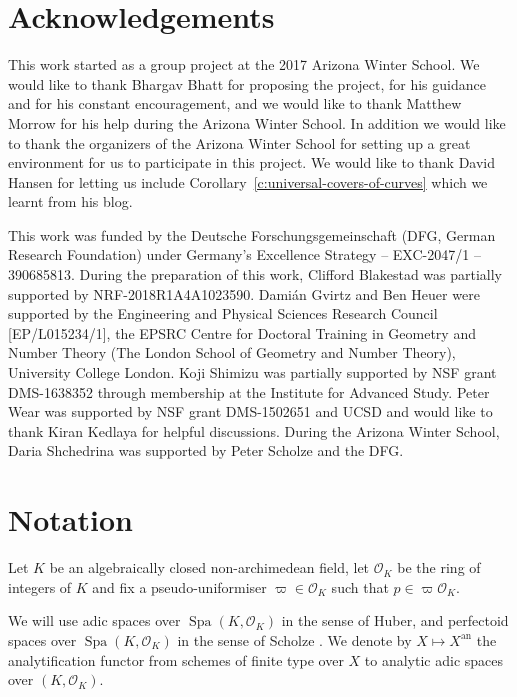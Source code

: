 \documentclass[10pt,oneside]{amsart}
\theoremstyle{definition}
\newcommand{\an}{\mathrm{an}}
\renewcommand{\O}{\mathcal{O}}
\begin{document}
 
 
 \section*{Acknowledgements}
 This work started as a group project at the 2017 Arizona Winter School. We would like to thank Bhargav Bhatt for proposing the project, for his guidance and for his constant encouragement, and we would like to thank Matthew Morrow for his help during the Arizona Winter School. In addition we would like to thank the organizers of the Arizona Winter School for setting up a great environment for us to participate in this project. We would like to thank David Hansen for letting us include Corollary~\ref{c:universal-covers-of-curves} which we learnt from his blog.
 
 This work was funded by the Deutsche Forschungsgemeinschaft (DFG, German Research Foundation) under Germany's Excellence Strategy – EXC-2047/1 – 390685813.
During the preparation of this work, Clifford Blakestad was partially supported by NRF-2018R1A4A1023590.
 Dami\'an Gvirtz and Ben Heuer were supported by the Engineering and Physical Sciences Research Council [EP/L015234/1], the EPSRC Centre for Doctoral Training in Geometry and Number Theory (The London School of Geometry and Number Theory), University College London. Koji Shimizu was partially supported by NSF grant DMS-1638352 through membership at the Institute for Advanced Study.
 Peter Wear was supported by NSF grant DMS-1502651 and UCSD and would like to thank Kiran Kedlaya for helpful discussions. 
 During the Arizona Winter School, Daria Shchedrina was supported by Peter Scholze and the DFG.


\section*{Notation}
	Let $K$ be an algebraically closed non-archimedean field, let $\mathcal O_K$ be the ring of integers of $K$ and fix a pseudo-uniformiser $\varpi\in \mathcal O_K$ such that $p\in\varpi\mathcal O_K$. 
	
	We will use adic spaces over $\operatorname{Spa}(K,\O_K)$ in the sense of Huber, and perfectoid spaces over $\operatorname{Spa}(K,\O_K)$ in the sense of Scholze \cite{perfectoid}. We denote by $X\mapsto X^{\an}$ the analytification functor from schemes of finite type over $X$ to analytic adic spaces over $(K,\O_K)$.
	
\end{document}
